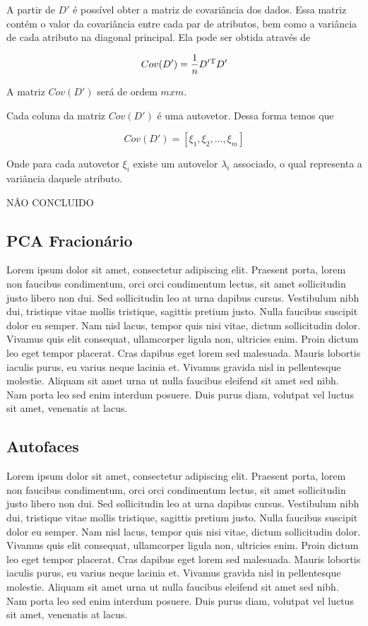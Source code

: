 \documentclass[12pt]{article}
\begin{document}
A partir de $D'$ é possível obter a matriz de covariância dos dados. Essa matriz contém o valor da covariância entre cada par de atributos, bem como a variância de cada atributo na diagonal principal. Ela pode ser obtida através de

\begin{equation}
Cov(D') = \frac{1}{n} D'\textsuperscript{T} D' \label{eq:cov_mat}
\end{equation}

A matriz $Cov(D')$ será de ordem $m x m$.

Cada coluna da matriz $Cov(D')$ é uma autovetor. Dessa forma temos que


$$
Cov(D') = [\xi_1, \xi_2, ..., \xi_m]
$$

Onde para cada autovetor $\xi_i$ existe um autovelor $\lambda_i$ associado, o qual representa a variância daquele atributo.

NÂO CONCLUIDO

\subsection{PCA Fracionário}

Lorem ipsum dolor sit amet, consectetur adipiscing elit. Praesent porta, lorem non faucibus condimentum, orci orci condimentum lectus, sit amet sollicitudin justo libero non dui. Sed sollicitudin leo at urna dapibus cursus. Vestibulum nibh dui, tristique vitae mollis tristique, sagittis pretium justo. Nulla faucibus suscipit dolor eu semper. Nam nisl lacus, tempor quis nisi vitae, dictum sollicitudin dolor. Vivamus quis elit consequat, ullamcorper ligula non, ultricies enim. Proin dictum leo eget tempor placerat. Cras dapibus eget lorem sed malesuada. Mauris lobortis iaculis purus, eu varius neque lacinia et. Vivamus gravida nisl in pellentesque molestie. Aliquam sit amet urna ut nulla faucibus eleifend sit amet sed nibh. Nam porta leo sed enim interdum posuere. Duis purus diam, volutpat vel luctus sit amet, venenatis at lacus. 

\subsection{Autofaces}

Lorem ipsum dolor sit amet, consectetur adipiscing elit. Praesent porta, lorem non faucibus condimentum, orci orci condimentum lectus, sit amet sollicitudin justo libero non dui. Sed sollicitudin leo at urna dapibus cursus. Vestibulum nibh dui, tristique vitae mollis tristique, sagittis pretium justo. Nulla faucibus suscipit dolor eu semper. Nam nisl lacus, tempor quis nisi vitae, dictum sollicitudin dolor. Vivamus quis elit consequat, ullamcorper ligula non, ultricies enim. Proin dictum leo eget tempor placerat. Cras dapibus eget lorem sed malesuada. Mauris lobortis iaculis purus, eu varius neque lacinia et. Vivamus gravida nisl in pellentesque molestie. Aliquam sit amet urna ut nulla faucibus eleifend sit amet sed nibh. Nam porta leo sed enim interdum posuere. Duis purus diam, volutpat vel luctus sit amet, venenatis at lacus. 
\end{document}
